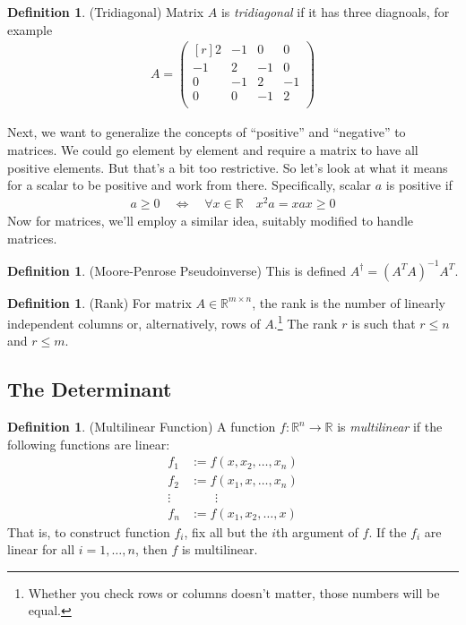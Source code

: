 \documentclass[12pt]{book}
\numberwithin{equation}{section} %
\theoremstyle{plain}
\theoremstyle{definition}
\newtheorem{defn}[thm]{Definition}
\theoremstyle{remark}
\newcommand{\R}{\mathbb{R}}
\begin{document}
\begin{defn}{(Tridiagonal)}
Matrix $A$ is \emph{tridiagonal} if it has three diagnoals, for example
\begin{align*}
  A =
  \begin{pmatrix}[r]
   2 & -1 &  0 &  0 \\
  -1 & 2 & -1 &  0 \\
   0 & -1 &  2 & -1 \\
   0 &  0 & -1 &  2 \\
  \end{pmatrix}
\end{align*}
\end{defn}

Next, we want to generalize the concepts of ``positive'' and
``negative'' to matrices. We could go element by element and require a
matrix to have all positive elements. But that's a bit too restrictive.
So let's look at what it means for a scalar to be positive and work from
there. Specifically, scalar $a$ is positive if
\begin{align*}
  a \geq 0
  \quad\Leftrightarrow\quad
  \forall x\in \R
  \quad
  x^2 a = x a x\geq 0
\end{align*}
Now for matrices, we'll employ a similar idea, suitably modified to
handle matrices.


\begin{defn}(Moore-Penrose Pseudoinverse)
This is defined $A^\dagger = (A^TA)^{-1}A^T$.
\end{defn}

\begin{defn}{(Rank)}
For matrix $A\in \R^{m \times n}$, the rank is the number of linearly
independent columns or, alternatively, rows of $A$.\footnote{Whether you
check rows or columns doesn't matter, those numbers will be equal.} The
rank $r$ is such that $r \leq n$ and $r\leq m$.
\end{defn}


\subsection{The Determinant}

\begin{defn}{(Multilinear Function)}
A function $f:\R^n\rightarrow \R$ is \emph{multilinear} if the following
functions are linear:
\begin{align*}
  f_1 &:= f(x,x_2,\ldots,x_n)\\
  f_2 &:= f(x_1,x,\ldots,x_n)\\
  \vdots\; & \qquad \vdots\\
  f_n &:= f(x_1,x_2,\ldots,x)
\end{align*}
That is, to construct function $f_i$, fix all but the $i$th argument of
$f$. If the $f_i$ are linear for all $i = 1,\ldots, n$, then $f$ is
multilinear.
\end{defn}
\end{document}
